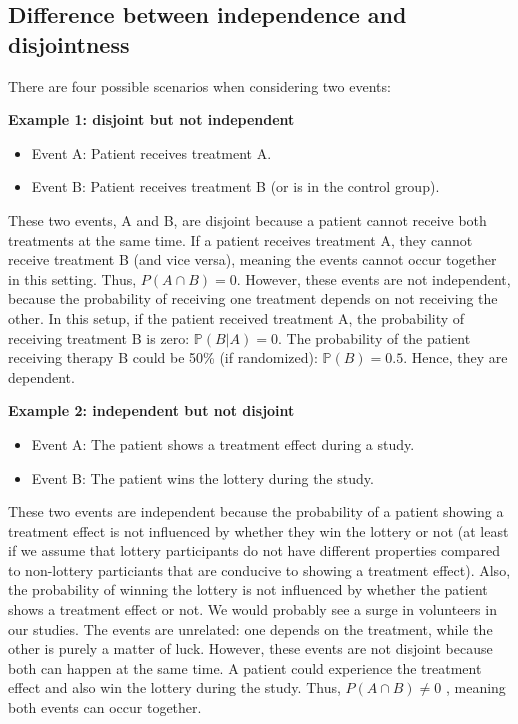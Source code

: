 \documentclass[
]{book}
\providecommand{\tightlist}{%
  \setlength{\itemsep}{0pt}\setlength{\parskip}{0pt}}
\begin{document}
\subsection{Difference between independence and disjointness}\label{difference-between-independence-and-disjointness}

There are four possible scenarios when considering two events:

\textbf{Example 1: disjoint but not independent}

\begin{itemize}
\tightlist
\item
  Event A: Patient receives treatment A.
\item
  Event B: Patient receives treatment B (or is in the control group).
\end{itemize}

These two events, A and B, are disjoint because a patient cannot receive both treatments at the same time. If a patient receives treatment A, they cannot receive treatment B (and vice versa), meaning the events cannot occur together in this setting. Thus, \(P(A \cap B) = 0\).
However, these events are not independent, because the probability of receiving one treatment depends on not receiving the other.
In this setup, if the patient received treatment A, the probability of receiving treatment B is zero: \(\mathbb{P}(B|A) = 0\).
The probability of the patient receiving therapy B could be 50\% (if randomized): \(\mathbb{P}(B) = 0.5\). Hence, they are dependent.

\textbf{Example 2: independent but not disjoint}

\begin{itemize}
\tightlist
\item
  Event A: The patient shows a treatment effect during a study.
\item
  Event B: The patient wins the lottery during the study.
\end{itemize}

These two events are independent because the probability of a patient showing a treatment effect is not influenced by whether they win the lottery or not
(at least if we assume that lottery participants do not have different properties compared to non-lottery particiants that are conducive to showing a treatment effect).
Also, the probability of winning the lottery is not influenced by whether the patient shows a treatment effect or not. We would probably see a surge
in volunteers in our studies.
The events are unrelated: one depends on the treatment, while the other is purely a matter of luck.
However, these events are not disjoint because both can happen at the same time.
A patient could experience the treatment effect and also win the lottery during the study. Thus, \(P(A \cap B) \neq 0\) , meaning both events can occur together.
\end{document}
